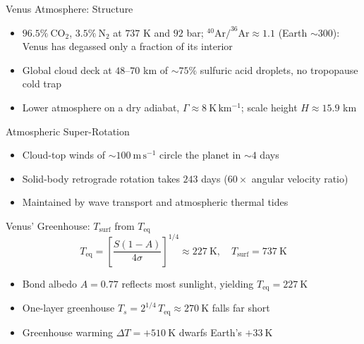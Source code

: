 \documentclass[aspectratio=169, 11pt]{beamer}
\begin{document}
\begin{frame}{Venus Atmosphere: Structure}
  \begin{itemize}
    \item $96.5\%\ \mathrm{CO_2}$, $3.5\%\ \mathrm{N_2}$ at $737$ K and $92$ bar; $^{40}\mathrm{Ar}/^{36}\mathrm{Ar} \approx 1.1$ (Earth $\sim 300$): Venus has degassed only a fraction of its interior
    \item Global cloud deck at $48$--$70$ km of $\sim 75\%$ sulfuric acid droplets, no tropopause cold trap
    \item Lower atmosphere on a dry adiabat, $\Gamma \approx 8\ \mathrm{K\,km^{-1}}$; scale height $H \approx 15.9$ km
  \end{itemize}
\end{frame}

\begin{frame}
\end{frame}

\begin{frame}{Atmospheric Super-Rotation}
  \begin{itemize}
    \item Cloud-top winds of $\sim 100\ \mathrm{m\,s^{-1}}$ circle the planet in $\sim 4$ days
    \item Solid-body retrograde rotation takes $243$ days ($60\times$ angular velocity ratio)
    \item Maintained by wave transport and atmospheric thermal tides
  \end{itemize}
\end{frame}

\begin{frame}{Venus' Greenhouse: $T_{\mathrm{surf}}$ from $T_{\mathrm{eq}}$}
  $$T_{\mathrm{eq}} = \left[\frac{S(1-A)}{4\sigma}\right]^{1/4} \approx 227\ \mathrm{K},\quad T_{\mathrm{surf}} = 737\ \mathrm{K}$$
  \begin{itemize}
    \item Bond albedo $A = 0.77$ reflects most sunlight, yielding $T_{\mathrm{eq}} = 227\ \mathrm{K}$
    \item One-layer greenhouse $T_s = 2^{1/4}\,T_{\mathrm{eq}} \approx 270\ \mathrm{K}$ falls far short
    \item Greenhouse warming $\Delta T = +510\ \mathrm{K}$ dwarfs Earth's $+33\ \mathrm{K}$
  \end{itemize}
  \vskip4pt
\end{frame}
\end{document}
